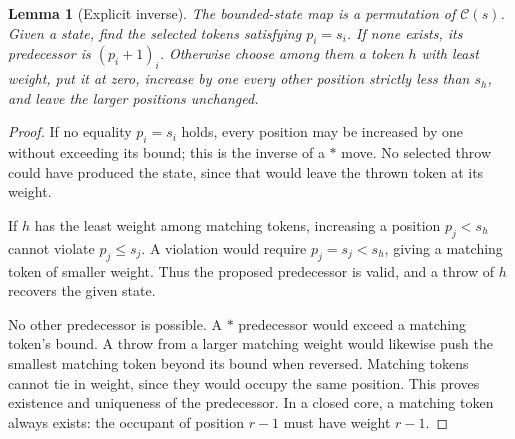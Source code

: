 \documentclass[11pt,letterpaper]{article}
\newtheorem{lemma}[theorem]{Lemma}
\theoremstyle{definition}
\newcommand{\states}{\mathcal C}
\begin{document}
\begin{lemma}[Explicit inverse]\label{lem:inverse}
The bounded-state map is a permutation of $\states(s)$. Given a state, find
the selected tokens satisfying $p_i=s_i$. If none exists, its predecessor
is $(p_i+1)_i$. Otherwise choose among them a token $h$ with least weight,
put it at zero, increase by one every other position strictly less than
$s_h$, and leave the larger positions unchanged.
\end{lemma}
\begin{proof}
If no equality $p_i=s_i$ holds, every position may be increased by one
without exceeding its bound; this is the inverse of a $\ast$ move.
No selected throw could have produced the state, since that would leave
the thrown token at its weight.

If $h$ has the least weight among matching tokens, increasing a position
$p_j<s_h$ cannot violate $p_j\le s_j$. A violation would require
$p_j=s_j<s_h$, giving a matching token of smaller weight. Thus the proposed
predecessor is valid, and a throw of $h$ recovers the given state.

No other predecessor is possible. A $\ast$ predecessor would exceed a
matching token's bound. A throw from a larger matching weight would likewise
push the smallest matching token beyond its bound when reversed. Matching
tokens cannot tie in weight, since they would occupy the same position.
This proves existence and uniqueness of the predecessor. In a closed core,
a matching token always exists: the occupant of position $r-1$ must have
weight $r-1$.
\end{proof}
\end{document}
